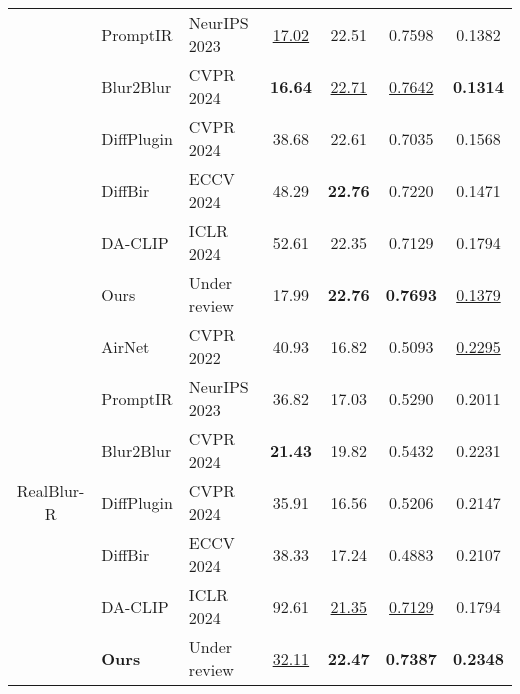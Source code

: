 \begin{table}[!t]
{\begin{tabular}{cllcccc}
&PromptIR       & NeurIPS 2023 & \uline{17.02} & 22.51 & 0.7598 & 0.1382 \\
&Blur2Blur       & CVPR 2024 & \textbf{16.64} & \uline{22.71} & \uline{0.7642} & \textbf{0.1314} \\
&DiffPlugin      & CVPR 2024    & 38.68 & 22.61 & 0.7035 & 0.1568 \\
&DiffBir         & ECCV 2024    & 48.29 & \textbf{22.76} & 0.7220  & 0.1471 \\
&DA-CLIP         & ICLR 2024    & 52.61 & 22.35 & 0.7129 & 0.1794 \\
&\cellcolor[HTML]{E6F0E8}Ours   &\cellcolor[HTML]{E6F0E8}Under review &\cellcolor[HTML]{E6F0E8}17.99 &\cellcolor[HTML]{E6F0E8}\textbf{22.76} &\cellcolor[HTML]{E6F0E8}\textbf{0.7693} &\cellcolor[HTML]{E6F0E8}\uline{0.1379} \\
\midrule
\multirow{7}{*}{RealBlur-R} 
&AirNet          & CVPR 2022    & 40.93 & 16.82 & 0.5093 & \uline{0.2295} \\
&PromptIR        & NeurIPS 2023 & 36.82 & 17.03 & 0.5290  & 0.2011 \\
&Blur2Blur       & CVPR 2024 & \textbf{21.43} & 19.82 & 0.5432 & 0.2231 \\
&DiffPlugin      & CVPR 2024    & 35.91 & 16.56 & 0.5206 & 0.2147 \\
&DiffBir         & ECCV 2024    & 38.33 & 17.24 & 0.4883 & 0.2107 \\
&DA-CLIP         & ICLR 2024    & 92.61 & \uline{21.35} & \uline{0.7129} & 0.1794 \\
&\cellcolor[HTML]{E6F0E8}\textbf{Ours}   &\cellcolor[HTML]{E6F0E8}Under review &\cellcolor[HTML]{E6F0E8}\uline{32.11} &\cellcolor[HTML]{E6F0E8}\textbf{22.47} &\cellcolor[HTML]{E6F0E8}\textbf{0.7387} &\cellcolor[HTML]{E6F0E8}\textbf{0.2348} \\
\bottomrule
\end{tabular}}
\vspace{-1mm}
\end{table}



